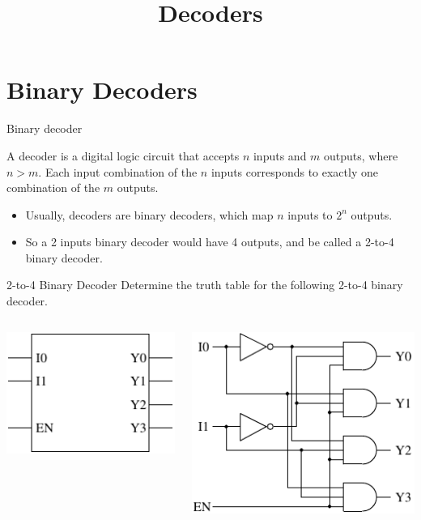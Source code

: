 \title{Decoders}


\section{Binary Decoders}

\begin{frame}{Binary decoder}
  \begin{definition}
    A \alert{decoder} is a digital logic circuit that accepts $n$ inputs and $m$ outputs, where $n>m$.  Each input combination of the $n$ inputs corresponds to exactly one combination of the $m$ outputs.
  \end{definition}
  \begin{itemize}
    \item Usually, decoders are \alert{binary decoders}, which map $n$ inputs to $2^n$ outputs.
    \item So a 2 inputs binary decoder would have 4 outputs, and be called a 2-to-4 binary decoder.
  \end{itemize}
\end{frame}

\begin{frame}{2-to-4 Binary Decoder}
  Determine the truth table for the following 2-to-4 binary decoder.\\
  \begin{columns}
    \begin{column}{6cm}
      \begin{center}
        \includegraphics{2to4BinaryDecoderComponent}
      \end{center}
    \end{column}
    \begin{column}{6cm}
      \begin{center}
        \includegraphics{2to4BinaryDecoderLogic}
      \end{center}
    \end{column}
  \end{columns}
\end{frame}

